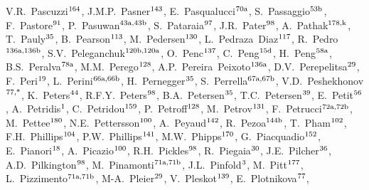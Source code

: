 \begin{flushleft}
V.R.~Pascuzzi$^\textrm{\scriptsize 164}$,    
J.M.P.~Pasner$^\textrm{\scriptsize 143}$,    
E.~Pasqualucci$^\textrm{\scriptsize 70a}$,    
S.~Passaggio$^\textrm{\scriptsize 53b}$,    
F.~Pastore$^\textrm{\scriptsize 91}$,    
P.~Pasuwan$^\textrm{\scriptsize 43a,43b}$,    
S.~Pataraia$^\textrm{\scriptsize 97}$,    
J.R.~Pater$^\textrm{\scriptsize 98}$,    
A.~Pathak$^\textrm{\scriptsize 178,k}$,    
T.~Pauly$^\textrm{\scriptsize 35}$,    
B.~Pearson$^\textrm{\scriptsize 113}$,    
M.~Pedersen$^\textrm{\scriptsize 130}$,    
L.~Pedraza~Diaz$^\textrm{\scriptsize 117}$,    
R.~Pedro$^\textrm{\scriptsize 136a,136b}$,    
S.V.~Peleganchuk$^\textrm{\scriptsize 120b,120a}$,    
O.~Penc$^\textrm{\scriptsize 137}$,    
C.~Peng$^\textrm{\scriptsize 15d}$,    
H.~Peng$^\textrm{\scriptsize 58a}$,    
B.S.~Peralva$^\textrm{\scriptsize 78a}$,    
M.M.~Perego$^\textrm{\scriptsize 128}$,    
A.P.~Pereira~Peixoto$^\textrm{\scriptsize 136a}$,    
D.V.~Perepelitsa$^\textrm{\scriptsize 29}$,    
F.~Peri$^\textrm{\scriptsize 19}$,    
L.~Perini$^\textrm{\scriptsize 66a,66b}$,    
H.~Pernegger$^\textrm{\scriptsize 35}$,    
S.~Perrella$^\textrm{\scriptsize 67a,67b}$,    
V.D.~Peshekhonov$^\textrm{\scriptsize 77,*}$,    
K.~Peters$^\textrm{\scriptsize 44}$,    
R.F.Y.~Peters$^\textrm{\scriptsize 98}$,    
B.A.~Petersen$^\textrm{\scriptsize 35}$,    
T.C.~Petersen$^\textrm{\scriptsize 39}$,    
E.~Petit$^\textrm{\scriptsize 56}$,    
A.~Petridis$^\textrm{\scriptsize 1}$,    
C.~Petridou$^\textrm{\scriptsize 159}$,    
P.~Petroff$^\textrm{\scriptsize 128}$,    
M.~Petrov$^\textrm{\scriptsize 131}$,    
F.~Petrucci$^\textrm{\scriptsize 72a,72b}$,    
M.~Pettee$^\textrm{\scriptsize 180}$,    
N.E.~Pettersson$^\textrm{\scriptsize 100}$,    
A.~Peyaud$^\textrm{\scriptsize 142}$,    
R.~Pezoa$^\textrm{\scriptsize 144b}$,    
T.~Pham$^\textrm{\scriptsize 102}$,    
F.H.~Phillips$^\textrm{\scriptsize 104}$,    
P.W.~Phillips$^\textrm{\scriptsize 141}$,    
M.W.~Phipps$^\textrm{\scriptsize 170}$,    
G.~Piacquadio$^\textrm{\scriptsize 152}$,    
E.~Pianori$^\textrm{\scriptsize 18}$,    
A.~Picazio$^\textrm{\scriptsize 100}$,    
R.H.~Pickles$^\textrm{\scriptsize 98}$,    
R.~Piegaia$^\textrm{\scriptsize 30}$,    
J.E.~Pilcher$^\textrm{\scriptsize 36}$,    
A.D.~Pilkington$^\textrm{\scriptsize 98}$,    
M.~Pinamonti$^\textrm{\scriptsize 71a,71b}$,    
J.L.~Pinfold$^\textrm{\scriptsize 3}$,    
M.~Pitt$^\textrm{\scriptsize 177}$,    
L.~Pizzimento$^\textrm{\scriptsize 71a,71b}$,    
M-A.~Pleier$^\textrm{\scriptsize 29}$,    
V.~Pleskot$^\textrm{\scriptsize 139}$,    
E.~Plotnikova$^\textrm{\scriptsize 77}$,    

\end{flushleft}
